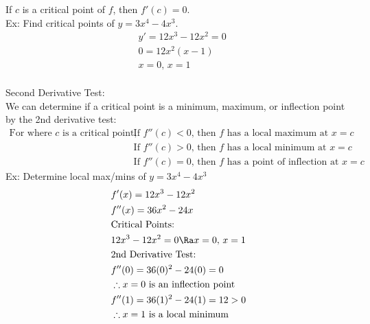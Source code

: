 If $c$ is a critical point of $f$, then $f'(c)=0$.\\
Ex: Find critical points of $y=3x^4-4x^3$.
\begin{align*}
    &y'=12x^3-12x^2=0\\
    &0=12x^2(x-1)\\
    &x=0,\,x=1
\end{align*}
\\
Second Derivative Test:\\
We can determine if a critical point is a minimum, maximum, or inflection point by the 2nd derivative test:
\begin{align*}
    \text{For where }c\text{ is a critical point, }
    &\text{If }f''(c)<0\text{, then $f$ has a local maximum at $x=c$}\\
    &\text{If }f''(c)>0\text{, then $f$ has a local minimum at $x=c$}\\
    &\text{If }f''(c)=0\text{, then $f$ has a point of inflection at $x=c$}
\end{align*}
Ex: Determine local max/mins of $y=3x^4-4x^3$
\begin{align*}
    &f'(x)=12x^3-12x^2\\
    &f''(x)=36x^2-24x\\
    &\text{Critical Points: }\\
    &12x^3-12x^2=0\Ra x=0,\,x=1\\
    &\text{2nd Derivative Test:}\\
    &f''(0)=36(0)^2-24(0)=0\\
    &\therefore x=0\text{ is an inflection point}\\
    &f''(1)=36(1)^2-24(1)=12>0\\
    &\therefore x=1\text{ is a local minimum}
\end{align*}

